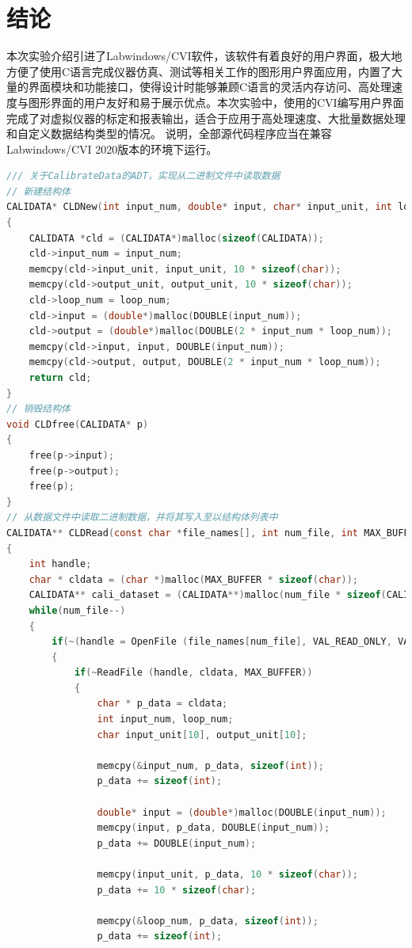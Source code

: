 \documentclass[a4paper,12pt,twoside]{article}%
\begin{document}
\section{结论}
本次实验介绍引进了Labwindows/CVI软件，该软件有着良好的用户界面，极大地方便了使用C语言完成仪器仿真、测试等相关工作的图形用户界面应用，内置了大量的界面模块和功能接口，使得设计时能够兼顾C语言的灵活内存访问、高处理速度与图形界面的用户友好和易于展示优点。本次实验中，使用的CVI编写用户界面完成了对虚拟仪器的标定和报表输出，适合于应用于高处理速度、大批量数据处理和自定义数据结构类型的情况。
\newpage
\appendix
\appendixpage
\addappheadtotoc
{}
说明，全部源代码程序应当在兼容Labwindows/CVI 2020版本的环境下运行。
\begin{lstlisting}[language=C]
/// 关于CalibrateData的ADT，实现从二进制文件中读取数据
// 新建结构体
CALIDATA* CLDNew(int input_num, double* input, char* input_unit, int loop_num, char* output_unit, double* output)
{
	CALIDATA *cld = (CALIDATA*)malloc(sizeof(CALIDATA));
	cld->input_num = input_num;
	memcpy(cld->input_unit, input_unit, 10 * sizeof(char));
	memcpy(cld->output_unit, output_unit, 10 * sizeof(char));
	cld->loop_num = loop_num;
	cld->input = (double*)malloc(DOUBLE(input_num));
	cld->output = (double*)malloc(DOUBLE(2 * input_num * loop_num));
	memcpy(cld->input, input, DOUBLE(input_num));
	memcpy(cld->output, output, DOUBLE(2 * input_num * loop_num));
	return cld;
}
// 销毁结构体
void CLDfree(CALIDATA* p)
{
	free(p->input);
	free(p->output);
	free(p);
}
// 从数据文件中读取二进制数据，并将其写入至以结构体列表中
CALIDATA** CLDRead(const char *file_names[], int num_file, int MAX_BUFFER)
{
	int handle;
	char * cldata = (char *)malloc(MAX_BUFFER * sizeof(char));
	CALIDATA** cali_dataset = (CALIDATA**)malloc(num_file * sizeof(CALIDATA*));
	while(num_file--)
	{
		if(~(handle = OpenFile (file_names[num_file], VAL_READ_ONLY, VAL_OPEN_AS_IS, VAL_BINARY)))
		{
			if(~ReadFile (handle, cldata, MAX_BUFFER))
			{
				char * p_data = cldata;
				int input_num, loop_num;
				char input_unit[10], output_unit[10];
				
				memcpy(&input_num, p_data, sizeof(int));
				p_data += sizeof(int);
				
				double* input = (double*)malloc(DOUBLE(input_num));
				memcpy(input, p_data, DOUBLE(input_num));
				p_data += DOUBLE(input_num);
				
				memcpy(input_unit, p_data, 10 * sizeof(char));
				p_data += 10 * sizeof(char);
				
				memcpy(&loop_num, p_data, sizeof(int));
				p_data += sizeof(int);
				

\end{lstlisting}
\end{document}
